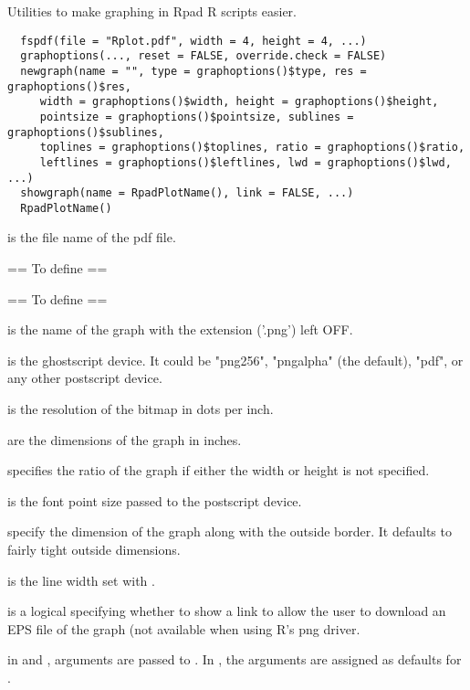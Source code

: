 \begin{Description}\relax
Utilities to make graphing in Rpad R scripts easier.
\end{Description}
\begin{Usage}
\begin{verbatim}
  fspdf(file = "Rplot.pdf", width = 4, height = 4, ...)
  graphoptions(..., reset = FALSE, override.check = FALSE)
  newgraph(name = "", type = graphoptions()$type, res = graphoptions()$res,
     width = graphoptions()$width, height = graphoptions()$height,
     pointsize = graphoptions()$pointsize, sublines = graphoptions()$sublines,
     toplines = graphoptions()$toplines, ratio = graphoptions()$ratio,
     leftlines = graphoptions()$leftlines, lwd = graphoptions()$lwd, ...)
  showgraph(name = RpadPlotName(), link = FALSE, ...)
  RpadPlotName()
\end{verbatim}
\end{Usage}
\begin{Arguments}
\begin{ldescription}
\item[\code{file}] is the file name of the pdf file.
\item[\code{reset}] == To define == 
\item[\code{override.check}] == To define == 
\item[\code{name}] is the name of the graph with the extension ('.png') left OFF.
\item[\code{type}] is the ghostscript device. It
could be "png256", "pngalpha" (the default), "pdf", or any other
postscript device.
\item[\code{res}] is the resolution of the bitmap in dots per inch.
\item[\code{width, height}] are the dimensions of the graph in inches.
\item[\code{ratio}] specifies the ratio of the graph if either the width or
height is not specified.
\item[\code{pointsize}] is the font point size passed to the postscript
device.
\item[\code{sublines, toplines, leftlines}] specify the dimension of
the graph along with the outside border. It defaults to fairly tight
outside dimensions.
\item[\code{lwd}] is the line width set with .
\item[\code{link}] is a logical specifying whether to show a link to allow
the user to download an EPS file of the graph (not available when
using R's png driver.
\item[\code{...}] in  and , arguments are passed
to . In , the arguments are
assigned as defaults for .
\end{ldescription}
\end{Arguments}
